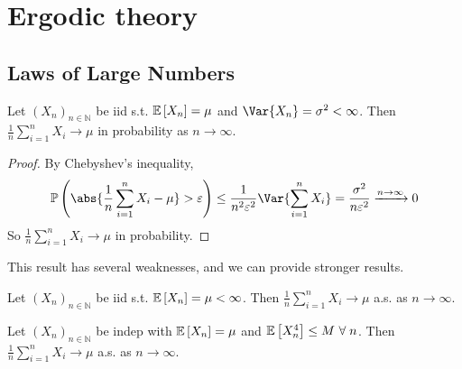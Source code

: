 \section{Ergodic theory}

\subsection{Laws of Large Numbers}

\begin{proposition}
	Let $(X_n)_{n \in \mathbb N}$ be iid s.t. $\mathbb{E}\left[{X_n}\right] = \mu$ and $\Var{X_n} = \sigma^2 < \infty$.
	Then $\frac{1}{n} \sum_{i=1}^n X_i \to \mu$ in probability as $n \to \infty$.
\end{proposition}

\begin{proof}
	By Chebyshev's inequality,
	\begin{align*}
        \prob{\abs{\frac{1}{n}\sum_{i=1}^n X_i - \mu} > \varepsilon} \leq \frac{1}{n^2 \varepsilon^2} \Var{\sum_{i=1}^n X_i} = \frac{\sigma^2}{n\varepsilon^2} \xrightarrow{n \to \infty} 0
    \end{align*}
	So $\frac{1}{n} \sum_{i=1}^n X_i \to \mu$ in probability.
\end{proof}

This result has several weaknesses, and we can provide stronger results.

\begin{proposition}
	Let $(X_n)_{n \in \mathbb N}$ be iid s.t. $\mathbb{E}\left[{X_n}\right] = \mu < \infty$.
	Then $\frac{1}{n} \sum_{i=1}^n X_i \to \mu$ a.s. as $n \to \infty$.
\end{proposition}

\begin{proposition}
	Let $(X_n)_{n \in \mathbb N}$ be indep with $\mathbb{E}\left[{X_n}\right] = \mu$ and $\mathbb{E}\left[{X_n^4}\right] \leq M \ \forall \; n$.
	Then $\frac{1}{n} \sum_{i=1}^n X_i \to \mu$ a.s. as $n \to \infty$.
\end{proposition}

